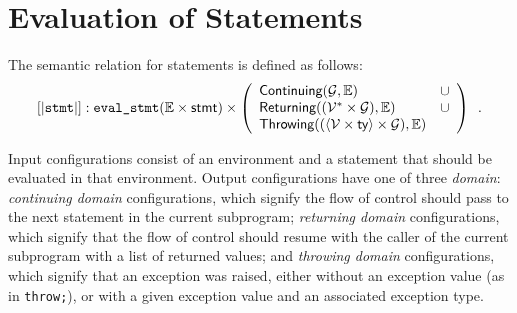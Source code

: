 \documentclass{book}
\newcommand\semantic[1]{\llbracket #1 \rrbracket}
\newcommand\XGraphs[0]{\mathcal{G}}
\newcommand\vals[0]{\mathcal{V}}
\newcommand\evalstmt[1]{\texttt{eval\_stmt}(#1)}
\newcommand\Throwing[0]{\textsf{Throwing}}
\newcommand\Continuing[0]{\textsf{Continuing}}
\newcommand\Returning[0]{\textsf{Returning}}
\begin{document}

\chapter{Evaluation of Statements \label{chap:eval_stmt}}

The semantic relation for statements is defined as follows:
\[
  \semantic{\texttt{stmt}} : \evalstmt{\envs \times \stmt} \times \left(
    \begin{array}{ll}
    \Continuing(\XGraphs, \envs) &\cup\\
    \Returning((\vals^* \times \XGraphs), \envs) &\cup\\
    \Throwing((\langle\vals \times \ty\rangle \times \XGraphs), \envs)&
    \end{array}
  \right) \enspace.
\]

Input configurations consist of an environment and a statement that should be evaluated in that environment.
Output configurations have one of three \emph{domain}: \emph{continuing domain} configurations, which signify
the flow of control should pass to the next statement in the current subprogram;
\emph{returning domain} configurations, which signify that the flow of control should resume with the caller
of the current subprogram with a list of returned values;
and \emph{throwing domain} configurations, which signify that an exception was raised, either without an exception value (as in \texttt{throw;}),
or with a given exception value and an associated exception type.
\end{document}
